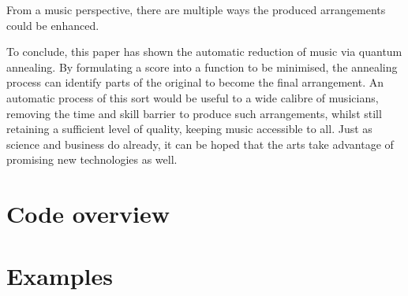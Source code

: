 \documentclass[12pt]{article}
\theoremstyle{definition}
\begin{document}
From a music perspective, there are multiple ways the produced arrangements could be enhanced.

To conclude, this paper has shown the automatic reduction of music via quantum annealing. By formulating a score into a function to be minimised, the annealing process can identify parts of the original to become the final arrangement. An automatic process of this sort would be useful to a wide calibre of musicians, removing the time and skill barrier to produce such arrangements, whilst still retaining a sufficient level of quality, keeping music accessible to all. Just as science and business do already, it can be hoped that the arts take advantage of promising new technologies as well.

\printbibliography[heading=bibintoc]

\clearpage
\appendix

\section{Code overview}
\label{app:code}

\section{Examples}
\label{app:examples}
\end{document}
